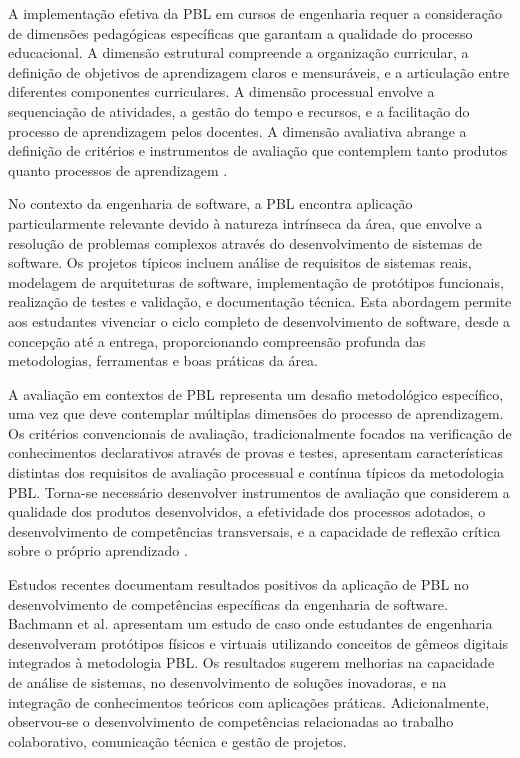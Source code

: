 \documentclass[12pt,a4paper]{article}
\begin{document}
A implementação efetiva da PBL em cursos de engenharia requer a consideração de dimensões pedagógicas específicas que garantam a qualidade do processo educacional. A dimensão estrutural compreende a organização curricular, a definição de objetivos de aprendizagem claros e mensuráveis, e a articulação entre diferentes componentes curriculares. A dimensão processual envolve a sequenciação de atividades, a gestão do tempo e recursos, e a facilitação do processo de aprendizagem pelos docentes. A dimensão avaliativa abrange a definição de critérios e instrumentos de avaliação que contemplem tanto produtos quanto processos de aprendizagem \cite{thomas2000}.

No contexto da engenharia de software, a PBL encontra aplicação particularmente relevante devido à natureza intrínseca da área, que envolve a resolução de problemas complexos através do desenvolvimento de sistemas de software. Os projetos típicos incluem análise de requisitos de sistemas reais, modelagem de arquiteturas de software, implementação de protótipos funcionais, realização de testes e validação, e documentação técnica. Esta abordagem permite aos estudantes vivenciar o ciclo completo de desenvolvimento de software, desde a concepção até a entrega, proporcionando compreensão profunda das metodologias, ferramentas e boas práticas da área.

A avaliação em contextos de PBL representa um desafio metodológico específico, uma vez que deve contemplar múltiplas dimensões do processo de aprendizagem. Os critérios convencionais de avaliação, tradicionalmente focados na verificação de conhecimentos declarativos através de provas e testes, apresentam características distintas dos requisitos de avaliação processual e contínua típicos da metodologia PBL. Torna-se necessário desenvolver instrumentos de avaliação que considerem a qualidade dos produtos desenvolvidos, a efetividade dos processos adotados, o desenvolvimento de competências transversais, e a capacidade de reflexão crítica sobre o próprio aprendizado \cite{hmelo2004}.

Estudos recentes documentam resultados positivos da aplicação de PBL no desenvolvimento de competências específicas da engenharia de software. Bachmann et al. \cite{bachmann2023} apresentam um estudo de caso onde estudantes de engenharia desenvolveram protótipos físicos e virtuais utilizando conceitos de gêmeos digitais integrados à metodologia PBL. Os resultados sugerem melhorias na capacidade de análise de sistemas, no desenvolvimento de soluções inovadoras, e na integração de conhecimentos teóricos com aplicações práticas. Adicionalmente, observou-se o desenvolvimento de competências relacionadas ao trabalho colaborativo, comunicação técnica e gestão de projetos.
\end{document}
